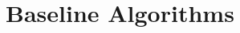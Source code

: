 \documentclass{article} %
\begin{document}


\section{Baseline Algorithms}
\label{sec:baseline_algorithms}
\end{document}
